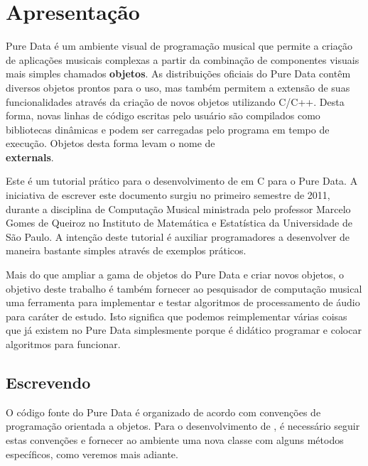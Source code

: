  
\chapter{Apresentação}

Pure Data é um ambiente visual de programação musical que permite a criação de
aplicações musicais complexas a partir da combinação de componentes visuais
mais simples chamados \textbf{objetos}. As distribuições oficiais do Pure Data
contêm diversos objetos prontos para o uso, mas também permitem a extensão de
suas funcionalidades através da criação de novos objetos utilizando C/C++.
Desta forma, novas linhas de código escritas pelo usuário são compilados como
bibliotecas dinâmicas e podem ser carregadas pelo programa em tempo de
execução. Objetos desta forma levam o nome de \textbf{\\externals}.

Este é um tutorial prático para o desenvolvimento de \externals em C para o
Pure Data. A iniciativa de escrever este documento surgiu no primeiro semestre
de 2011, durante a disciplina de Computação Musical ministrada pelo professor
Marcelo Gomes de Queiroz no Instituto de Matemática e Estatística da
Universidade de São Paulo. A intenção deste tutorial é auxiliar programadores
a desenvolver \externals de maneira bastante simples através de exemplos
práticos.

Mais do que ampliar a gama de objetos do Pure Data e criar novos objetos, o
objetivo deste trabalho é também fornecer ao pesquisador de computação musical
uma ferramenta para implementar e testar algoritmos de processamento de áudio
para caráter de estudo. Isto significa que podemos reimplementar várias coisas
que já existem no Pure Data simplesmente porque é didático programar e colocar
algoritmos para funcionar.

\section{Escrevendo \externals}

O código fonte do Pure Data é organizado de acordo com convenções de
programação orientada a objetos. Para o desenvolvimento de \externals, é
necessário seguir estas convenções e fornecer ao ambiente uma nova classe com
alguns métodos específicos, como veremos mais adiante.


